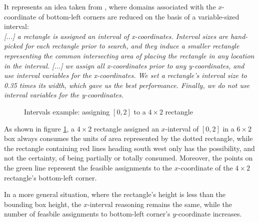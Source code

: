\documentclass[a4paper,10pt]{article}
\newcounter{subsubsubsection}[subsubsection]
\begin{document}
 \label{sec:intervals-approach}
It represents an idea taken from \cite{rect-packing}, where domains associated with the $x$-coordinate of bottom-left corners are reduced on the basis of a variable-sized interval:\\
\emph{[...] a rectangle is assigned an interval of x-coordinates. Interval sizes are hand-picked for each rectangle prior to search, and they induce a smaller rectangle representing the common intersecting area of placing the rectangle in any location in the interval. [...] we assign all x-coordinates prior to any y-coordinates, and use interval variables for the x-coordinates. We set a rectangle’s interval size to 0.35 times its width, which gave us the best performance. Finally, we do not use interval variables for the y-coordinates.}

\begin{figure}[h]
   \centering
   \caption{Intervals example: assigning $[0,2]$ to a $4\times2$ rectangle}
   \label{fig:intervals}
\end{figure}

As shown in figure \ref{fig:intervals}, a $4\times2$ rectangle assigned an $x$-interval of $[0,2]$ in a $6\times2$ box always consumes the units of area represented by the dotted rectangle,
while the rectangle containing red lines heading south west only has the possibility, and not the certainty, of being partially or totally consumed.
Moreover, the points on the green line represent the feasible assignments to the $x$-coordinate of the $4\times2$ rectangle's bottom-left corner.

In a more general situation, where the rectangle's height is less than the bounding box height, the $x$-interval reasoning remains the same, while the number of feasbile assignments to bottom-left corner's $y$-coordinate increases. 
\end{document}
